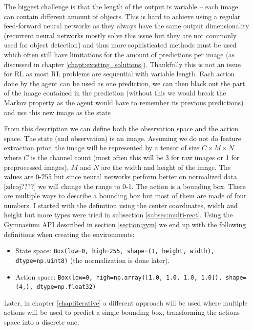 \documentclass[
  digital,     %
  oneside,     %
  nosansbold,  %
  nocolorbold, %
  lof,         %
  lot,         %
]{fithesis4}
\begin{document}
The biggest challenge is that the length of the output is variable -- each image can contain different amount of objects. This is hard to achieve using a regular feed-forward neural networks as they always have the same output dimensionality (recurrent neural networks mostly solve this issue but they are not commonly used for object detection) and thus more sophisticated methods must be used which often still have limitations for the amount of predictions per image (as discussed in chapter \ref{chapt:existing_solutions}). Thankfully this is not an issue for RL as most RL problems are sequential with variable length. Each action done by the agent can be used as one prediction, we can then black out the part of the image contained in the prediction (without this we would break the Markov property as the agent would have to remember its previous predictions) and use this new image as the state

From this description we can define both the observation space and the action space. The state (and observation) is an image. Assuming we do not do feature extraction prior, the image will be represented by a tensor of size $C\times M \times N$ where $C$ is the channel count (most often this will be 3 for raw images or 1 for preprocessed images), $M$ and $N$ are the width and height of the image. The values are 0-255 but since neural networks perform better on normalized data [zdroj????] we will change the range to 0-1. The action is a bounding box. There are multiple ways to describe a bounding box but most of them are made of four numbers. I started with the definition using the center coordinates, width and height but more types were tried in subsection \ref{subsec:multi-rect}. Using the Gymnasium API described in section \ref{section:gym} we end up with the following definitions when creating the environments:

\begin{itemize}
    \item State space: \texttt{Box(low=0, high=255, shape=(1, height, width), dtype=np.uint8)} (the normalization is done later).
    \item Action space: \texttt{Box(low=0, high=np.array([1.0, 1.0, 1.0, 1.0]), shape=(4,), dtype=np.float32)}
\end{itemize}

Later, in chapter \ref{chap:iterative} a different approach will be used where multiple actions will be used to predict a single bounding box, transforming the actions space into a discrete one.
\end{document}
